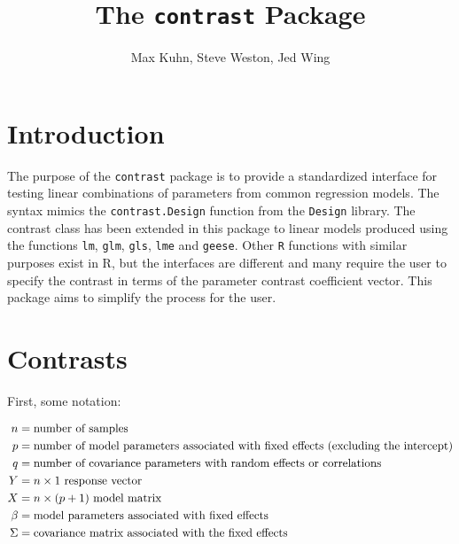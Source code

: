 \documentclass[12pt]{article}
\title{The \texttt{contrast} Package}
\author{Max Kuhn, Steve Weston, Jed Wing}
\newcommand{\contrast}{{\tt contrast}\xspace}
\begin{document}
\maketitle

\thispagestyle{empty}
	
\section{Introduction}

The purpose of the \contrast package is to provide a standardized interface for testing linear combinations of parameters from common regression models. The syntax mimics the \texttt{contrast.Design} function from the \texttt{Design} library. The contrast class has been extended in this package to linear models produced using the functions \texttt{lm}, \texttt{glm}, \texttt{gls}, \texttt{lme} and \texttt{geese}. Other \texttt{R} functions with similar purposes exist in R, but the interfaces are different and many require the user to specify the contrast in terms of the parameter contrast coefficient vector. This package aims to simplify the process for the user.

\section{Contrasts}

First, some notation:

\begin{align}
   n &= \text{number of samples} \notag \\
   p &= \text{number of model parameters associated with fixed effects (excluding the intercept)} \notag \\
   q &= \text{number of covariance parameters with random effects or correlations } \notag \\
   Y &= \text{$n\times 1$ response vector} \notag \\
   X &= \text{$n\times (p+1)$ model matrix} \notag \\
   \beta &= \text{model parameters associated with fixed effects} \notag \\
   \Sigma &= \text{covariance matrix associated with the fixed effects} \notag \\
\end{align}
\end{document}
